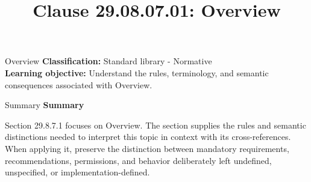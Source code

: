 \documentclass[10pt,letterpaper]{article}
\title{Clause 29.08.07.01: Overview}
\author{}
\date{}
\begin{document}
\maketitle
\begin{CornellOverviewBox}{Overview}
\textbf{Classification:} Standard library - Normative\\[2pt]
\textbf{Learning objective:} Understand the rules, terminology, and semantic consequences associated with Overview.
\end{CornellOverviewBox}\begin{CornellSummaryBox}{Summary}
{\sffamily\bfseries\color{Accent} Summary}\par\vspace{3pt}Section 29.8.7.1 focuses on Overview. The section supplies the rules and semantic distinctions needed to interpret this topic in context with its cross-references. When applying it, preserve the distinction between mandatory requirements, recommendations, permissions, and behavior deliberately left undefined, unspecified, or implementation-defined.
\end{CornellSummaryBox}
\end{document}
